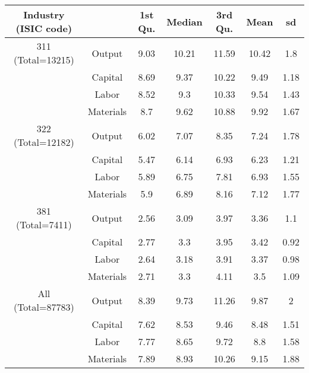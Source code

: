 \begin{table}[H]
\centering
\begin{tabular}{ccccccc}
  \hline\hline Industry (ISIC code) &   & 1st Qu. & Median & 3rd Qu. & Mean & sd \\ 
  \hline
311 (Total=13215) & Output & 9.03 & 10.21 & 11.59 & 10.42 & 1.8 \\ 
   & Capital & 8.69 & 9.37 & 10.22 & 9.49 & 1.18 \\ 
   & Labor & 8.52 & 9.3 & 10.33 & 9.54 & 1.43 \\ 
   & Materials & 8.7 & 9.62 & 10.88 & 9.92 & 1.67 \\ 
  322 (Total=12182) & Output & 6.02 & 7.07 & 8.35 & 7.24 & 1.78 \\ 
   & Capital & 5.47 & 6.14 & 6.93 & 6.23 & 1.21 \\ 
   & Labor & 5.89 & 6.75 & 7.81 & 6.93 & 1.55 \\ 
   & Materials & 5.9 & 6.89 & 8.16 & 7.12 & 1.77 \\ 
  381 (Total=7411) & Output & 2.56 & 3.09 & 3.97 & 3.36 & 1.1 \\ 
   & Capital & 2.77 & 3.3 & 3.95 & 3.42 & 0.92 \\ 
   & Labor & 2.64 & 3.18 & 3.91 & 3.37 & 0.98 \\ 
   & Materials & 2.71 & 3.3 & 4.11 & 3.5 & 1.09 \\ 
  All (Total=87783) & Output & 8.39 & 9.73 & 11.26 & 9.87 & 2 \\ 
   & Capital & 7.62 & 8.53 & 9.46 & 8.48 & 1.51 \\ 
   & Labor & 7.77 & 8.65 & 9.72 & 8.8 & 1.58 \\ 
   & Materials & 7.89 & 8.93 & 10.26 & 9.15 & 1.88 \\ 
   \hline
\end{tabular}
\end{table}
